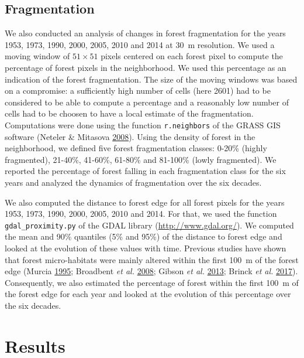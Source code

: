 \documentclass[]{article}
\theoremstyle{definition}
\theoremstyle{definition}
\theoremstyle{definition}
\theoremstyle{remark}
\begin{document}
\hypertarget{fragmentation}{%
\subsection{Fragmentation}\label{fragmentation}}

We also conducted an analysis of changes in forest fragmentation for the
years 1953, 1973, 1990, 2000, 2005, 2010 and 2014 at 30~m resolution. We
used a moving window of \(51 \times 51\) pixels centered on each forest
pixel to compute the percentage of forest pixels in the neighborhood. We
used this percentage as an indication of the forest fragmentation. The
size of the moving windows was based on a compromise: a sufficiently
high number of cells (here 2601) had to be considered to be able to
compute a percentage and a reasonably low number of cells had to be
choosen to have a local estimate of the fragmentation. Computations were
done using the function \texttt{r.neighbors} of the GRASS GIS software
(Neteler \& Mitasova \protect\hyperlink{ref-Neteler2008}{2008}). Using
the density of forest in the neighborhood, we defined five forest
fragmentation classes: 0-20\% (highly fragmented), 21-40\%, 41-60\%,
61-80\% and 81-100\% (lowly fragmented). We reported the percentage of
forest falling in each fragmentation class for the six years and
analyzed the dynamics of fragmentation over the six decades.

We also computed the distance to forest edge for all forest pixels for
the years 1953, 1973, 1990, 2000, 2005, 2010 and 2014. For that, we used
the function \texttt{gdal\_proximity.py} of the GDAL library
(\url{http://www.gdal.org/}). We computed the mean and 90\% quantiles
(5\% and 95\%) of the distance to forest edge and looked at the
evolution of these values with time. Previous studies have shown that
forest micro-habitats were mainly altered within the first 100~m of the
forest edge (Murcia \protect\hyperlink{ref-Murcia1995}{1995}; Broadbent
\emph{et al.} \protect\hyperlink{ref-Broadbent2008}{2008}; Gibson
\emph{et al.} \protect\hyperlink{ref-Gibson2013}{2013}; Brinck \emph{et
al.} \protect\hyperlink{ref-Brinck2017}{2017}). Consequently, we also
estimated the percentage of forest within the first 100~m of the forest
edge for each year and looked at the evolution of this percentage over
the six decades.

\hypertarget{results}{%
\section{Results}\label{results}}
\end{document}
